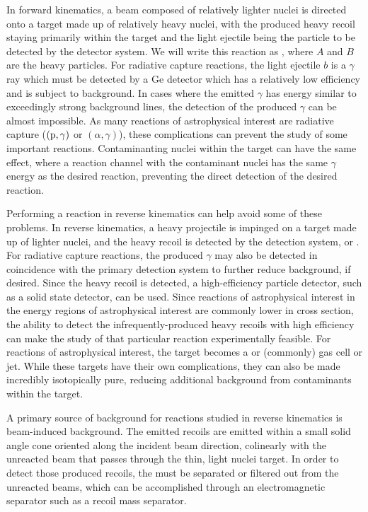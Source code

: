 In forward kinematics, a beam composed of relatively lighter nuclei is
directed onto a target made up of relatively heavy nuclei, with the
produced heavy recoil staying primarily within the target and the light
ejectile being the particle to be detected by the detector system. We
will write this reaction as , where $A$ and $B$ are
the heavy particles. For radiative capture reactions, the light ejectile
$b$ is a $\gamma$ ray which must be detected by a Ge detector which has
a relatively low efficiency and is subject to background. In cases where
the emitted $\gamma$ has energy similar to exceedingly strong background
lines, the detection of the produced $\gamma$ can be almost impossible.
As many reactions of astrophysical interest are radiative capture
($({\rm p},\gamma)$ or $(\alpha,\gamma)$), these complications can
prevent the study of some important reactions. Contaminanting nuclei
within the target can have the same effect, where a reaction channel
with the contaminant nuclei has the same $\gamma$ energy as the desired
reaction, preventing the direct detection of the desired reaction.

Performing a reaction in reverse kinematics can help avoid some of these
problems. In reverse kinematics, a heavy projectile is impinged on a
target made up of lighter nuclei, and the heavy recoil is detected by
the detection system, or . For radiative capture
reactions, the produced $\gamma$ may also be detected in coincidence
with the primary detection system to further reduce background, if
desired. Since the heavy recoil is detected, a high-efficiency particle
detector, such as a solid state detector, can be used. Since reactions
of astrophysical interest in the energy regions of astrophysical
interest are commonly lower in cross section, the ability to detect the
infrequently-produced heavy recoils with high efficiency can make the
study of that particular reaction experimentally feasible. For reactions
of astrophysical interest, the target becomes a  or
 (commonly) gas cell or jet. While these targets have their
own complications, they can also be made incredibly isotopically pure,
reducing additional background from contaminants within the target.

A primary source of background for reactions studied in reverse
kinematics is beam-induced background. The emitted recoils are emitted
within a small solid angle cone oriented along the incident beam
direction, colinearly with the unreacted beam that passes through the
thin, light nuclei target. In order to detect those produced recoils,
the must be separated or filtered out from the unreacted beams, which
can be accomplished through an electromagnetic separator such as a
recoil mass separator.

